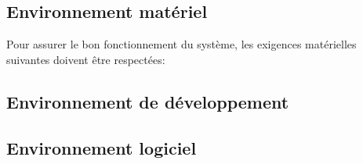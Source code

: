 \subsection{Environnement matériel}
Pour assurer le bon fonctionnement du système, les exigences matérielles suivantes doivent être respectées:


\subsection{Environnement de développement}


\subsection{Environnement logiciel}

